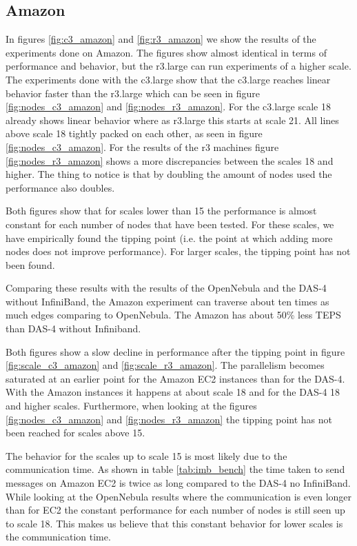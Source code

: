\subsection{Amazon}
\label{res:amazon}
In figures \ref{fig:c3_amazon} and \ref{fig:r3_amazon} we show the results of the experiments done on Amazon. The figures show almost identical in terms of performance and behavior, but the r3.large can run experiments of a higher scale. The experiments done with the c3.large show that the c3.large reaches linear behavior faster than the r3.large which can be seen in figure \ref{fig:nodes_c3_amazon} and \ref{fig:nodes_r3_amazon}. For the c3.large scale 18 already shows linear behavior where as r3.large this starts at scale 21. All lines above scale 18 tightly packed on each other, as seen in figure \ref{fig:nodes_c3_amazon}.
For the results of the r3 machines figure \ref{fig:nodes_r3_amazon} shows a more discrepancies between the scales 18 and higher. The thing to notice is that by doubling the amount of nodes used the performance also doubles.
 
Both figures show that for scales lower than 15 the performance is almost constant for each number of nodes that have been tested. For these scales, we have empirically found the tipping point (i.e. the point at which adding more nodes does not improve performance). For larger scales, the tipping point has not been found. 

Comparing these results with the results of the OpenNebula and the DAS-4 without InfiniBand, the Amazon experiment can traverse about ten times as much edges comparing to OpenNebula. The Amazon has about 50\% less TEPS than DAS-4 without Infiniband.

Both figures show a slow decline in performance after the tipping point in figure \ref{fig:scale_c3_amazon} and \ref{fig:scale_r3_amazon}. The parallelism becomes saturated at an earlier point for the Amazon EC2 instances than for the DAS-4. With the Amazon instances it happens at about scale 18 and for the DAS-4 18 and higher scales. Furthermore, when looking at the figures \ref{fig:nodes_c3_amazon} and \ref{fig:nodes_r3_amazon} the tipping point has not been reached for scales above 15. 
  
The behavior for the scales up to scale 15 is most likely due to the communication time. As shown in table \ref{tab:imb_bench} the time taken to send messages on Amazon EC2 is twice as long compared to the DAS-4 no InfiniBand. While looking at the OpenNebula results where the communication is even longer than for EC2 the constant performance for each number of nodes is still seen up to scale 18. This makes us believe that this constant behavior for lower scales is the communication time.

